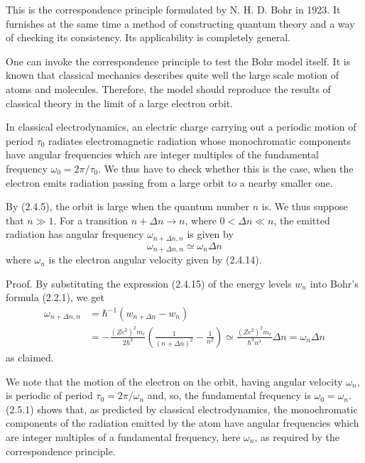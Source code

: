 \documentclass{article}
\begin{document}
This is the correspondence principle formulated by N. H. D. Bohr in 1923. It furnishes at the same time a method of constructing quantum theory and a way of checking its consistency. Its applicability is completely general.

One can invoke the correspondence principle to test the Bohr model itself. It is known that classical mechanics describes quite well the large scale motion of atoms and molecules. Therefore, the model should reproduce the results of classical theory in the limit of a large electron orbit.

In classical electrodynamics, an electric charge carrying out a periodic motion of period $\tau_{0}$ radiates electromagnetic radiation whose monochromatic components have angular frequencies which are integer multiples of the fundamental frequency $\omega_{0}=2 \pi / \tau_{0}$. We thus have to check whether this is the case, when the electron emits radiation passing from a large orbit to a nearby smaller one.

By (2.4.5), the orbit is large when the quantum number $n$ is. We thus suppose that $n \gg 1$. For a transition $n+\Delta n \rightarrow n$, where $0<\Delta n \ll n$, the emitted radiation has angular frequency $\omega_{n+\Delta n, n}$ is given by
$$
\begin{equation*}
\omega_{n+\Delta n, n} \simeq \omega_{n} \Delta n \tag{2.5.1}
\end{equation*}
$$
where $\omega_{n}$ is the electron angular velocity given by (2.4.14).

Proof. By substituting the expression (2.4.15) of the energy levels $w_{n}$ into Bohr's formula (2.2.1), we get
$$
\begin{align*}
\omega_{n+\Delta n, n} & =\hbar^{-1}\left(w_{n+\Delta n}-w_{n}\right)  \tag{2.5.2}\\
& =-\frac{\left(Z e^{2}\right)^{2} m_{r}}{2 \hbar^{3}}\left(\frac{1}{(n+\Delta n)^{2}}-\frac{1}{n^{2}}\right) \simeq \frac{\left(Z e^{2}\right)^{2} m_{r}}{\hbar^{3} n^{3}} \Delta n=\omega_{n} \Delta n
\end{align*}
$$
as claimed.

We note that the motion of the electron on the orbit, having angular velocity $\omega_{n}$, is periodic of period $\tau_{0}=2 \pi / \omega_{n}$ and, so, the fundamental frequency is $\omega_{0}=\omega_{n}$. (2.5.1) shows that, as predicted by classical electrodynamics, the monochromatic components of the radiation emitted by the atom have angular frequencies which are integer multiples of a fundamental frequency, here $\omega_{n}$, as required by the correspondence principle.
\end{document}
